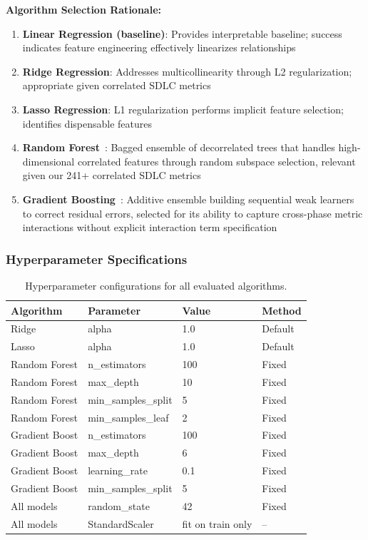 \documentclass[technologies,article,submit,pdftex,moreauthors]{Definitions/mdpi}
\begin{document}
\textbf{Algorithm Selection Rationale:}

\begin{enumerate}
\def\labelenumi{\arabic{enumi}.}
\item
  \textbf{Linear Regression (baseline)}: Provides interpretable
  baseline; success indicates feature engineering effectively linearizes
  relationships
\item
  \textbf{Ridge Regression}: Addresses multicollinearity through L2
  regularization; appropriate given correlated SDLC metrics
\item
  \textbf{Lasso Regression}: L1 regularization performs implicit feature
  selection; identifies dispensable features
\item
  \textbf{Random Forest}~\cite{breiman2001}: Bagged ensemble of
  decorrelated trees that handles high-dimensional correlated features
  through random subspace selection, relevant given our 241+ correlated
  SDLC metrics
\item
  \textbf{Gradient Boosting}~\cite{friedman2001}: Additive ensemble
  building sequential weak learners to correct residual errors, selected
  for its ability to capture cross-phase metric interactions without
  explicit interaction term specification
\end{enumerate}

\subsubsection{Hyperparameter Specifications}\label{sec:hyperparams}

{\def\LTcaptype{none} %
\begin{table}[H]
\centering
\caption{Hyperparameter configurations for all evaluated algorithms.\label{tab:hyperparams}}
\begin{tabular}{@{}llll@{}}
\toprule
\textbf{Algorithm} & \textbf{Parameter} & \textbf{Value} &
\textbf{Method} \\
\midrule
Ridge & alpha & 1.0 & Default \\
Lasso & alpha & 1.0 & Default \\
Random Forest & n\_estimators & 100 & Fixed \\
Random Forest & max\_depth & 10 & Fixed \\
Random Forest & min\_samples\_split & 5 & Fixed \\
Random Forest & min\_samples\_leaf & 2 & Fixed \\
Gradient Boost & n\_estimators & 100 & Fixed \\
Gradient Boost & max\_depth & 6 & Fixed \\
Gradient Boost & learning\_rate & 0.1 & Fixed \\
Gradient Boost & min\_samples\_split & 5 & Fixed \\
All models & random\_state & 42 & Fixed \\
All models & StandardScaler & fit on train only & -- \\
\bottomrule
\end{tabular}
\end{table}
}
\end{document}

